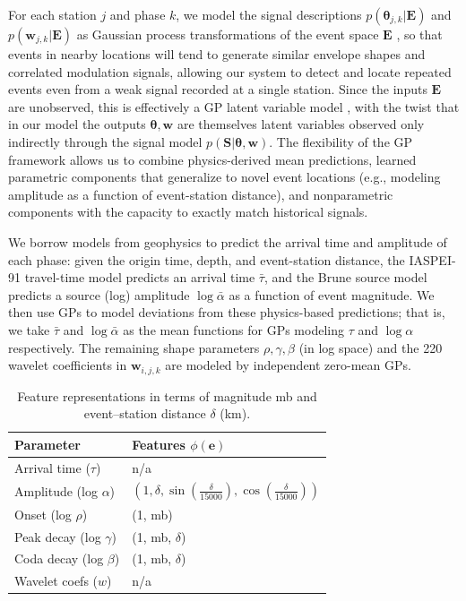 \documentclass[twoside]{article} \usepackage{aistats2017}
\renewcommand{\v}[1]{\mathbf{#1}}
\begin{document}
For each station $j$ and phase $k$, we model the signal
descriptions $p(\v{\theta}_{j,k} | \v{E})$ and $p(\v{w}_{j,k} | \v{E})$ as Gaussian process 
transformations of the event space $\v{E}$ \citep{rasmussen2006}, so that events in
nearby locations will tend to generate similar envelope shapes and
correlated modulation signals, allowing our system to detect and
locate repeated events even from a weak signal recorded at a single
station. Since the inputs $\v{E}$ are unobserved, this is effectively a
GP latent variable model \citep{lawrence2004gaussian}, with the twist that in our model the
outputs $\v{\theta}, \v{w}$ are themselves latent
variables observed only indirectly through the signal model
$p(\v{S} | \v{\theta}, \v{w})$. The flexibility
of the GP framework allows us to combine physics-derived mean
predictions, learned parametric components that generalize to novel event
locations (e.g., modeling amplitude as a function of event-station
distance), and nonparametric components with the capacity to exactly
match historical signals. 

We borrow models from geophysics to predict the arrival time and
amplitude of each phase: given the origin time, depth, and
event-station distance, the IASPEI-91 \citep{kennett1991traveltimes} travel-time
model predicts an arrival time $\bar{\tau}$, and the Brune
source model \citep{brune1970tectonic} predicts a source (log) amplitude
$\log \bar{\alpha}$ as a function of event magnitude. We then use
GPs to model deviations from these physics-based predictions; that is,
we take $\bar{\tau}$ and $\log \bar{\alpha}$ as the
mean functions for GPs modeling $\tau$ and $\log
\alpha$ respectively. The remaining shape parameters $\rho, \gamma,
\beta$ (in log space) and the 220 wavelet coefficients in $\v{w}_{i,j,k}$ are 
modeled by independent zero-mean GPs. 

\begin{table}
\centering
\begin{tabular}{ll}
\hline
\textbf{Parameter} & \textbf{Features $\phi(\v{e})$} \\\hline
Arrival time ($\tau$) & n/a  \\
Amplitude (log $\alpha$) & $\left(1,\delta,\sin(\frac{\delta}{15000}),
                           \cos(\frac{\delta}{15000})\right)$ \\
Onset (log $\rho$) & (1, mb) \\
Peak decay (log $\gamma$) & (1, mb, $\delta$) \\
Coda decay (log $\beta$) & (1, mb, $\delta$) \\
Wavelet coefs ($w$) & n/a \\\hline
\end{tabular}
\caption{Feature representations in terms
  of magnitude mb and event--station distance $\delta$ (km).}
\label{tbl:gp_models}
\end{table}
\end{document}
